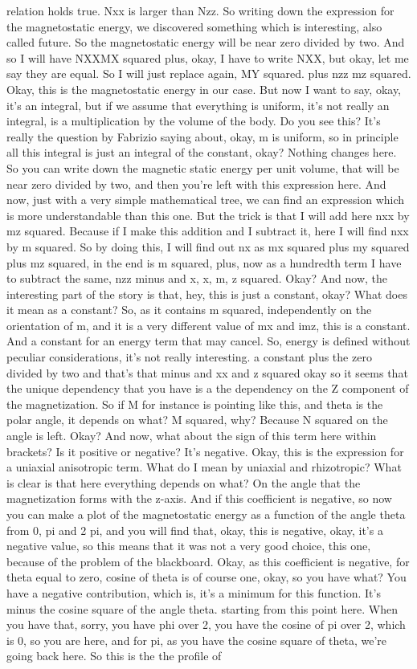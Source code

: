 relation holds true. Nxx is larger than Nzz. So writing down the expression for the magnetostatic energy, we discovered something which is interesting, also called future. So the magnetostatic energy will be near zero divided by two. And so I will have NXXMX squared plus, okay, I have to write NXX, but okay, let me say they are equal. So I will just replace again, MY squared. plus nzz mz squared. Okay, this is the magnetostatic energy in our case. But now I want to say, okay, it's an integral, but if we assume that everything is uniform, it's not really an integral, is a multiplication by the volume of the body. Do you see this? It's really the question by Fabrizio saying about, okay, m is uniform, so in principle all this integral is just an integral of the constant, okay? Nothing changes here. So you can write down the magnetic static energy per unit volume, that will be near zero divided by two, and then you're left with this expression here. And now, just with a very simple mathematical tree, we can find an expression which is more understandable than this one. But the trick is that I will add here nxx by mz squared. Because if I make this addition and I subtract it, here I will find nxx by m squared. So by doing this, I will find out nx as mx squared plus my squared plus mz squared, in the end is m squared, plus, now as a hundredth term I have to subtract the same, nzz minus and x, x, m, z squared. Okay? And now, the interesting part of the story is that, hey, this is just a constant, okay? What does it mean as a constant? So, as it contains m squared, independently on the orientation of m, and it is a very different value of mx and imz, this is a constant. And a constant for an energy term that may cancel. So, energy is defined without peculiar considerations, it's not really interesting. a constant plus the zero divided by two and that's that minus and xx and z squared okay so it seems that the unique dependency that you have is a the dependency on the Z component of the magnetization. So if M for instance is pointing like this, and theta is the polar angle, it depends on what? M squared, why? Because N squared on the angle is left. Okay? And now, what about the sign of this term here within brackets? Is it positive or negative? It's negative. Okay, this is the expression for a uniaxial anisotropic term. What do I mean by uniaxial and rhizotropic? What is clear is that here everything depends on what? On the angle that the magnetization forms with the z-axis. And if this coefficient is negative, so now you can make a plot of the magnetostatic energy as a function of the angle theta from 0, pi and 2 pi, and you will find that, okay, this is negative, okay, it's a negative value, so this means that it was not a very good choice, this one, because of the problem of the blackboard. Okay, as this coefficient is negative, for theta equal to zero, cosine of theta is of course one, okay, so you have what? You have a negative contribution, which is, it's a minimum for this function. It's minus the cosine square of the angle theta. starting from this point here. When you have that, sorry, you have phi over 2, you have the cosine of pi over 2, which is 0, so you are here, and for pi, as you have the cosine square of theta, we're going back here. So this is the the profile of 